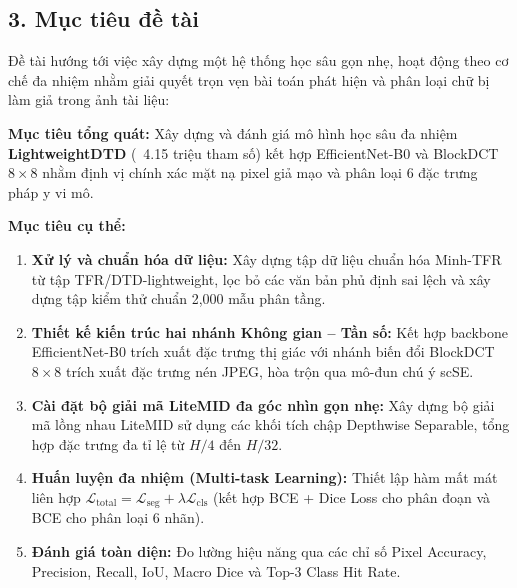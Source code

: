 \subsection{3. Mục tiêu đề tài}

\indent\indent Đề tài hướng tới việc xây dựng một hệ thống học sâu gọn nhẹ, hoạt động theo cơ chế đa nhiệm nhằm giải quyết trọn vẹn bài toán phát hiện và phân loại chữ bị làm giả trong ảnh tài liệu:\vspace{0.3cm}

\textbf{Mục tiêu tổng quát:}
Xây dựng và đánh giá mô hình học sâu đa nhiệm \textbf{LightweightDTD} (~4.15 triệu tham số) kết hợp EfficientNet-B0 và BlockDCT $8 \times 8$ nhằm định vị chính xác mặt nạ pixel giả mạo và phân loại 6 đặc trưng pháp y vi mô.

\textbf{Mục tiêu cụ thể:}
\begin{enumerate}[label=\alph*)]
    \item \textbf{Xử lý và chuẩn hóa dữ liệu:} Xây dựng tập dữ liệu chuẩn hóa Minh-TFR từ tập TFR/DTD-lightweight, lọc bỏ các văn bản phủ định sai lệch và xây dựng tập kiểm thử chuẩn 2,000 mẫu phân tầng.
    \item \textbf{Thiết kế kiến trúc hai nhánh Không gian -- Tần số:} Kết hợp backbone EfficientNet-B0 trích xuất đặc trưng thị giác với nhánh biến đổi BlockDCT $8 \times 8$ trích xuất đặc trưng nén JPEG, hòa trộn qua mô-đun chú ý scSE.
    \item \textbf{Cài đặt bộ giải mã LiteMID đa góc nhìn gọn nhẹ:} Xây dựng bộ giải mã lồng nhau LiteMID sử dụng các khối tích chập Depthwise Separable, tổng hợp đặc trưng đa tỉ lệ từ $H/4$ đến $H/32$.
    \item \textbf{Huấn luyện đa nhiệm (Multi-task Learning):} Thiết lập hàm mất mát liên hợp $\mathcal{L}_{\text{total}} = \mathcal{L}_{\text{seg}} + \lambda \mathcal{L}_{\text{cls}}$ (kết hợp BCE + Dice Loss cho phân đoạn và BCE cho phân loại 6 nhãn).
    \item \textbf{Đánh giá toàn diện:} Đo lường hiệu năng qua các chỉ số Pixel Accuracy, Precision, Recall, IoU, Macro Dice và Top-3 Class Hit Rate.
\end{enumerate}
